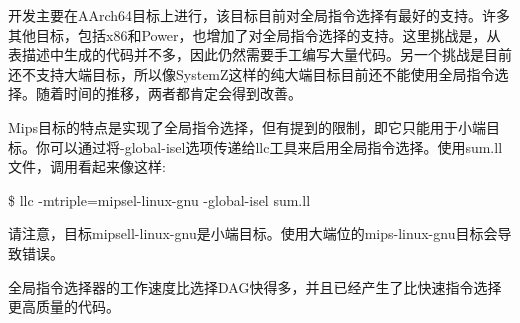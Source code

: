 开发主要在AArch64目标上进行，该目标目前对全局指令选择有最好的支持。许多其他目标，包括x86和Power，也增加了对全局指令选择的支持。这里挑战是，从表描述中生成的代码并不多，因此仍然需要手工编写大量代码。另一个挑战是目前还不支持大端目标，所以像SystemZ这样的纯大端目标目前还不能使用全局指令选择。随着时间的推移，两者都肯定会得到改善。\par

Mips目标的特点是实现了全局指令选择，但有提到的限制，即它只能用于小端目标。你可以通过将-global-isel选项传递给llc工具来启用全局指令选择。使用sum.ll文件，调用看起来像这样:\par

\begin{tcolorbox}[colback=white,colframe=black]
\$ llc -mtriple=mipsel-linux-gnu -global-isel sum.ll
\end{tcolorbox}

请注意，目标mipsell-linux-gnu是小端目标。使用大端位的mips-linux-gnu目标会导致错误。\par

全局指令选择器的工作速度比选择DAG快得多，并且已经产生了比快速指令选择更高质量的代码。\par









